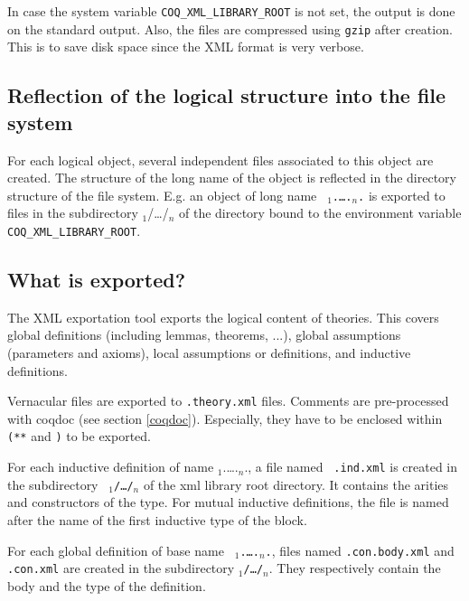 \Rem In case the system variable {\tt COQ\_XML\_LIBRARY\_ROOT} is not set,
the output is done on the standard output. Also, the files are
compressed using {\tt gzip} after creation. This is to save disk space
since the XML format is very verbose.

\subsection{Reflection of the logical structure into the file system}

For each {\Coq} logical object, several independent files associated
to this object are created.  The structure of the long name of the
object is reflected in the directory structure of the file system.
E.g. an object of long name {\tt
{\ident$_1$}.{\ldots}.{\ident$_n$}.{\ident}} is exported to files in the
subdirectory {{\ident$_1$}/{\ldots}/{\ident$_n$}} of the directory 
bound to the environment variable {\tt COQ\_XML\_LIBRARY\_ROOT}.

\subsection{What is exported?}

The XML exportation tool exports the logical content of {\Coq}
theories. This covers global definitions (including lemmas, theorems,
...), global assumptions (parameters and axioms), local assumptions or
definitions, and inductive definitions.

Vernacular files are exported to {\tt .theory.xml} files. 
Comments are pre-processed with {\sf coqdoc} (see section
\ref{coqdoc}). Especially, they have to be enclosed within {\tt (**}
and {\tt *)} to be exported.

For each inductive definition of name
{\ident$_1$}.{\ldots}.{\ident$_n$}.{\ident}, a file named {\tt
{\ident}.ind.xml} is created in the subdirectory {\tt
{\ident$_1$}/{\ldots}/{\ident$_n$}} of the xml library root
directory. It contains the arities and constructors of the type. For mutual inductive definitions, the file is named after the
name of the first inductive type of the block.

For each global definition of base name {\tt
{\ident$_1$}.{\ldots}.{\ident$_n$}.{\ident}}, files named
{\tt {\ident}.con.body.xml} and {\tt {\ident}.con.xml} are created in the
subdirectory {\tt {\ident$_1$}/{\ldots}/{\ident$_n$}}. They
respectively contain the body and the type of the definition.


